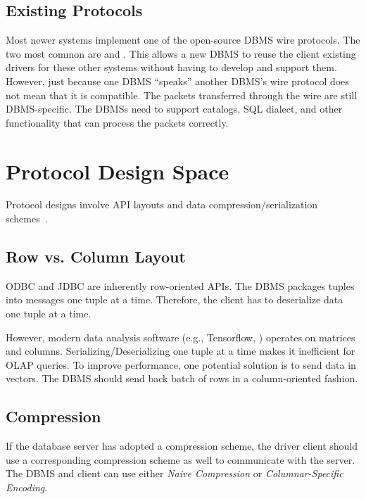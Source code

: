 \documentclass[11pt]{article}
\begin{document}
\subsection*{Existing Protocols}
Most newer systems implement one of the open-source DBMS wire protocols. The two most common are 
 and . This allows a new DBMS to reuse the client existing drivers for 
these other systems without having to develop and support them. However, just because one DBMS 
``speaks'' another DBMS's wire protocol does not mean that it is compatible. The packets transferred 
through the wire are still DBMS-specific. The DBMSs need to support catalogs, SQL dialect, and 
other functionality that can process the packets correctly.

\section{Protocol Design Space}
Protocol designs involve API layouts and data compression/serialization 
schemes~\cite{Raasveldt2017}.

\subsection*{Row vs. Column Layout}
ODBC and JDBC are inherently row-oriented APIs. The DBMS packages tuples into messages one tuple 
at a time. Therefore, the client has to deserialize data one tuple at a time. 

However, modern data analysis software (e.g., Tensorflow, ) operates on matrices and 
columns. Serializing/Deserializing one tuple at a time makes it inefficient for OLAP queries. To 
improve performance, one potential solution is to send data in vectors. The DBMS should send back 
batch of rows in a column-oriented fashion.

\subsection*{Compression}
If the database server has adopted a compression scheme, the driver client should use a 
corresponding compression scheme as well to communicate with the server. The DBMS and client can use 
either \textit{Naive Compression} or \textit{Columnar-Specific Encoding}.
\end{document}
